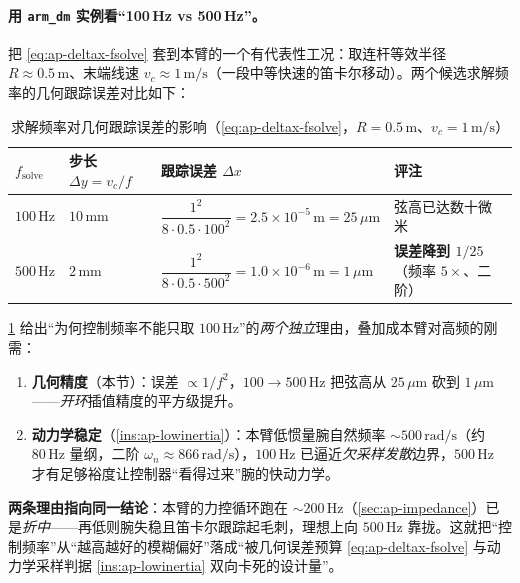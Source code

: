 \paragraph{用 \texttt{arm\_dm} 实例看“100\,Hz vs 500\,Hz”。}
把 \cref{eq:ap-deltax-fsolve} 套到本臂的一个有代表性工况：取连杆等效半径 $R\approx0.5\,\mathrm{m}$、末端线速 $v_c\approx1\,\mathrm{m/s}$（一段中等快速的笛卡尔移动）。两个候选求解频率的几何跟踪误差对比如下：

\begin{table}[H]\centering\small
\caption{求解频率对几何跟踪误差的影响（\cref{eq:ap-deltax-fsolve}，$R=0.5\,\mathrm{m}$、$v_c=1\,\mathrm{m/s}$）}
\begin{tabular}{p{} p{} p{} p{}}
\toprule
$f_{\mathrm{solve}}$ & 步长 $\Delta y=v_c/f$ & 跟踪误差 $\Delta x$ & 评注 \\
\midrule
$100\,\mathrm{Hz}$ & $10\,\mathrm{mm}$ & $\dfrac{1^2}{8\cdot0.5\cdot100^2}=2.5\times10^{-5}\,\mathrm{m}=25\,\mu\mathrm{m}$ & 弦高已达数十微米 \\
$500\,\mathrm{Hz}$ & $2\,\mathrm{mm}$ & $\dfrac{1^2}{8\cdot0.5\cdot500^2}=1.0\times10^{-6}\,\mathrm{m}=1\,\mu\mathrm{m}$ & \textbf{误差降到 $1/25$}（频率 $5\times$、二阶）\\
\bottomrule
\end{tabular}
\label{tab:ap-fsolve-error}
\end{table}

\begin{insight}\label{ins:ap-why-highfreq}
\cref{tab:ap-fsolve-error} 给出“为何控制频率不能只取 $100\,\mathrm{Hz}$”的\emph{两个独立}理由，叠加成本臂对高频的刚需：
\begin{enumerate}
  \item \textbf{几何精度}（本节）：误差 $\propto1/f^2$，$100\!\to\!500\,\mathrm{Hz}$ 把弦高从 $25\,\mu\mathrm{m}$ 砍到 $1\,\mu\mathrm{m}$——\emph{开环}插值精度的平方级提升。
  \item \textbf{动力学稳定}（\cref{ins:ap-lowinertia}）：本臂低惯量腕自然频率 $\sim500\,\mathrm{rad/s}$（约 $80\,\mathrm{Hz}$ 量纲，二阶 $\omega_n\approx866\,\mathrm{rad/s}$），$100\,\mathrm{Hz}$ 已逼近\emph{欠采样发散}边界，$500\,\mathrm{Hz}$ 才有足够裕度让控制器“看得过来”腕的快动力学。
\end{enumerate}
\textbf{两条理由指向同一结论}：本臂的力控循环跑在 $\sim200\,\mathrm{Hz}$（\cref{sec:ap-impedance}）已是\emph{折中}——再低则腕失稳且笛卡尔跟踪起毛刺，理想上向 $500\,\mathrm{Hz}$ 靠拢。这就把“控制频率”从“越高越好的模糊偏好”落成“被几何误差预算 \cref{eq:ap-deltax-fsolve} 与动力学采样判据 \cref{ins:ap-lowinertia} 双向卡死的设计量”。
\end{insight}

